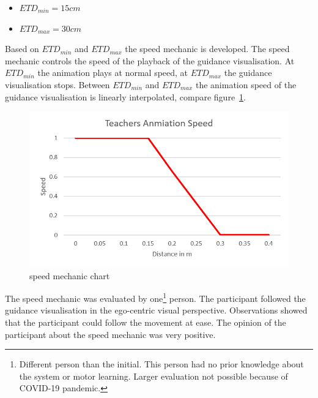 \begin{itemize}
	\item[] $ETD_{min}=15cm$
	\item[] $ETD_{max}=30cm$
\end{itemize}
Based on $ETD_{min}$ and  $ETD_{max}$ the speed mechanic is developed. The speed mechanic controls the speed of the playback of the guidance visualisation. At $ETD_{min}$ the animation plays at normal speed, at $ETD_{max}$ the guidance visualisation stops. Between $ETD_{min}$ and $ETD_{max}$ the animation speed of the guidance visualisation is linearly interpolated, compare figure~\ref{fig:speed_mechanic}.
\begin{figure}[htb]
	\centering
	\includegraphics[width=\textwidth]{figures/speed_mechanic_chart.png}
	\caption[speed mechanic chart]{speed mechanic chart}
	\label{fig:speed_mechanic}
\end{figure}
The speed mechanic was evaluated by one\footnote{Different person than the initial. This person had no prior knowledge about the system or motor learning. Larger evaluation not possible because of COVID-19 pandemic.} person. The participant followed the guidance visualisation in the ego-centric visual perspective. Observations showed that the participant could follow the movement at ease. The opinion of the participant about the speed mechanic was very positive.



